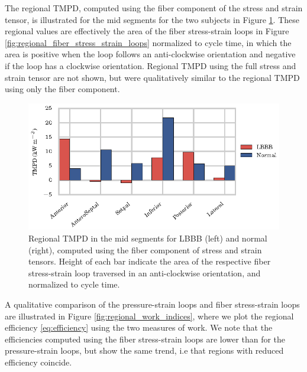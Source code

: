 The regional TMPD, computed using the fiber
component of the stress and strain tensor, is illustrated for the mid
segments for the two subjects in Figure
\ref{fig:regional_power_density}. These regional values are
effectively the area of the fiber stress-strain loops in Figure
\ref{fig:regional_fiber_stress_strain_loops} normalized to cycle
time, in which the area is positive when the loop follows an
anti-clockwise orientation and negative if the loop has a clockwise
orientation. Regional TMPD using the full stress and strain tensor are
not shown, but were qualitatively similar to the regional TMPD using
only the fiber component.


\begin{figure}[htbp]
  \centering
  \includegraphics{figures/regional_power_density}
  \caption{\label{fig:regional_power_density} Regional TMPD in the mid
    segments for LBBB (left) and normal (right), computed using the
    fiber component of stress and strain tensors. Height of each bar
    indicate the area of the respective fiber stress-strain loop
    traversed in an anti-clockwise orientation, and normalized to
    cycle time.}  
\end{figure}

A qualitative comparison of the pressure-strain loops and fiber
stress-strain loops are illustrated in Figure
\ref{fig:regional_work_indices}, where we plot the regional efficiency
\eqref{eq:efficiency} using the two measures of work. We note that the
efficiencies computed using the fiber stress-strain loops are
lower than for the pressure-strain loops, but show the same trend, i.e
that regions with reduced efficiency coincide.  


